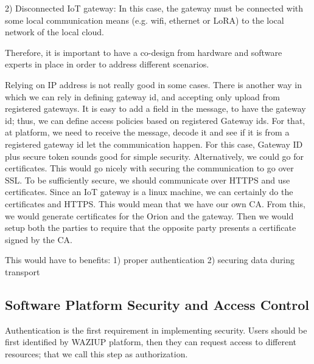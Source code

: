 2) Disconnected IoT gateway: In this case, the gateway must be connected with some local communication means (e.g. wifi, ethernet or LoRA) to the local network of the local cloud.

Therefore, it is important to have a co-design from hardware and software experts in place in order to address different scenarios.

Relying on IP address is not really good in some cases. There is another way in which we can rely in defining gateway id, and accepting only upload from registered gateways. It is easy to add a field in the message, to have the gateway id; thus, we can define access policies based on registered Gateway ids.  For that, at platform, we need to receive the message, decode it and see if it is from a registered gateway id let the communication happen. For this case,  Gateway ID plus secure token sounds good for simple security. Alternatively, we could go for certificates. This would go nicely with securing the communication to go over SSL. To be sufficiently secure, we should communicate over HTTPS and use certificates. Since an IoT gateway is a linux machine, we can certainly do the certificates and HTTPS.
This would mean that we have our own CA. From this, we would generate certificates for the Orion and the gateway. Then we would setup both the parties to require that the opposite party presents a certificate signed by the CA.

This would have to benefits:
1) proper authentication
2) securing data during transport

\subsection{Software Platform Security and Access Control}

Authentication is the first requirement in implementing security. Users should be first identified by WAZIUP platform, then they can request access to different resources; that we call this step as authorization.


